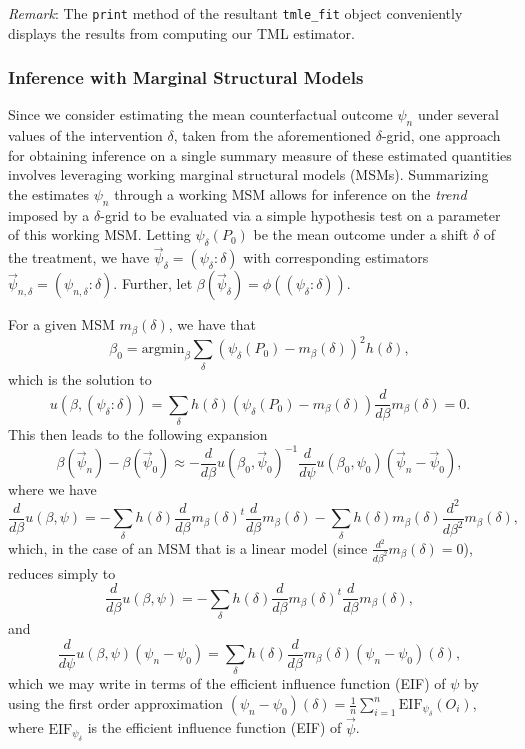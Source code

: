 \documentclass[12pt, krantz2,]{krantz}
\theoremstyle{definition}
\theoremstyle{definition}
\theoremstyle{definition}
\newcommand{\1}{\mathbbm{1}}
\begin{document}
\emph{Remark}: The \texttt{print} method of the resultant \texttt{tmle\_fit} object conveniently
displays the results from computing our TML estimator.

\hypertarget{inference-with-marginal-structural-models}{%
\subsubsection{Inference with Marginal Structural Models}\label{inference-with-marginal-structural-models}}

Since we consider estimating the mean counterfactual outcome \(\psi_n\) under
several values of the intervention \(\delta\), taken from the aforementioned
\(\delta\)-grid, one approach for obtaining inference on a single summary measure
of these estimated quantities involves leveraging working marginal structural
models (MSMs). Summarizing the estimates \(\psi_n\) through a working MSM allows
for inference on the \emph{trend} imposed by a \(\delta\)-grid to be evaluated via a
simple hypothesis test on a parameter of this working MSM. Letting
\(\psi_{\delta}(P_0)\) be the mean outcome under a shift \(\delta\) of the
treatment, we have \(\vec{\psi}_{\delta} = (\psi_{\delta}: \delta)\) with
corresponding estimators \(\vec{\psi}_{n, \delta} = (\psi_{n, \delta}: \delta)\).
Further, let \(\beta(\vec{\psi}_{\delta}) = \phi((\psi_{\delta}: \delta))\).

For a given MSM \(m_{\beta}(\delta)\), we have that
\[\beta_0 = \text{argmin}_{\beta} \sum_{\delta}(\psi_{\delta}(P_0) -
m_{\beta}(\delta))^2 h(\delta),\]
which is the solution to
\[u(\beta, (\psi_{\delta}: \delta)) = \sum_{\delta}h(\delta)
\left(\psi_{\delta}(P_0) - m_{\beta}(\delta) \right) \frac{d}{d\beta}
m_{\beta}(\delta) = 0.\]
This then leads to the following expansion
\[\beta(\vec{\psi}_n) - \beta(\vec{\psi}_0) \approx -\frac{d}{d\beta}
  u(\beta_0, \vec{\psi}_0)^{-1} \frac{d}{d\psi} u(\beta_0, \psi_0)
  (\vec{\psi}_n - \vec{\psi}_0),\]
where we have
\[\frac{d}{d\beta} u(\beta, \psi) = -\sum_{\delta} h(\delta) \frac{d}{d\beta}
m_{\beta}(\delta)^t \frac{d}{d\beta} m_{\beta}(\delta)
-\sum_{\delta} h(\delta) m_{\beta}(\delta) \frac{d^2}{d\beta^2}
m_{\beta}(\delta),\]
which, in the case of an MSM that is a linear model (since
\(\frac{d^2}{d\beta^2} m_{\beta}(\delta) = 0\)), reduces simply to
\[\frac{d}{d\beta} u(\beta, \psi) = -\sum_{\delta} h(\delta) \frac{d}{d\beta}
m_{\beta}(\delta)^t \frac{d}{d\beta} m_{\beta}(\delta),\]
and
\[\frac{d}{d\psi}u(\beta, \psi)(\psi_n - \psi_0) = \sum_{\delta} h(\delta)
\frac{d}{d\beta} m_{\beta}(\delta) (\psi_n - \psi_0)(\delta),\]
which we may write in terms of the efficient influence function (EIF) of \(\psi\)
by using the first order approximation \((\psi_n - \psi_0)(\delta) = \frac{1}{n}\sum_{i = 1}^n \text{EIF}_{\psi_{\delta}}(O_i)\),
where \(\text{EIF}_{\psi_{\delta}}\) is the efficient influence function (EIF) of
\(\vec{\psi}\).
\end{document}
